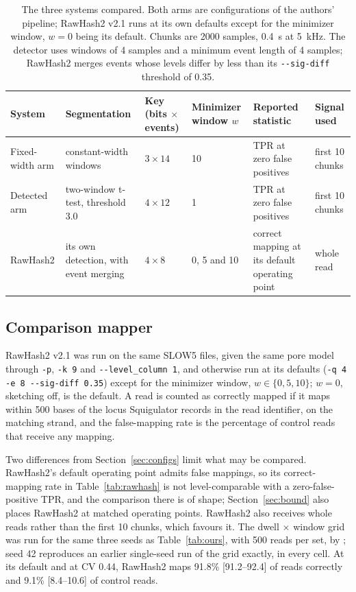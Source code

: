 \documentclass[11pt,a4paper]{article}
\begin{document}
\begin{table}[t]
\centering
\caption{The three systems compared. Both arms are configurations of the authors' pipeline;
RawHash2 v2.1 runs at its own defaults except for the minimizer window, $w = 0$ being its default.
Chunks are 2000 samples, 0.4~s at 5~kHz. The detector uses windows of 4 samples and a minimum event
length of 4 samples; RawHash2 merges events whose levels differ by less than its
\texttt{-{}-sig-diff} threshold of 0.35.}
\label{tab:configs}
\small
\setlength{\tabcolsep}{4pt}
\begin{tabular}{L{2.1cm}L{3.3cm}L{1.6cm}L{1.6cm}L{3.0cm}L{1.8cm}}
\toprule
System & Segmentation & Key (bits $\times$ events) & Minimizer window $w$ & Reported statistic & Signal used \\
\midrule
Fixed-width arm & constant-width windows & $3 \times 14$ & 10 & TPR at zero false positives & first 10 chunks \\
Detected arm & two-window t-test, threshold 3.0 & $4 \times 12$ & 1 & TPR at zero false positives & first 10 chunks \\
RawHash2 & its own detection, with event merging & $4 \times 8$ & 0, 5 and 10 & correct mapping at its default operating point & whole read \\
\bottomrule
\end{tabular}
\end{table}

\subsection{Comparison mapper}\label{sec:rawhash}

RawHash2 v2.1 was run on the same SLOW5 files, given the same pore model through \texttt{-p},
\texttt{-k~9} and \texttt{-{}-level\_column~1}, and otherwise run at its defaults
(\texttt{-q 4 -e 8 -{}-sig-diff 0.35}) except for the minimizer window, $w \in \{0, 5, 10\}$;
$w = 0$, sketching off, is the default. A read is counted as correctly mapped if it maps within 500 bases
of the locus Squigulator records in the read identifier, on the matching strand, and the
false-mapping rate is the percentage of control reads that receive any mapping.

Two differences from Section~\ref{sec:configs} limit what may be compared. RawHash2's default
operating point admits false mappings, so its correct-mapping rate in Table~\ref{tab:rawhash} is not
level-comparable with a zero-false-positive TPR, and the comparison there is of shape;
Section~\ref{sec:bound} also places RawHash2 at matched operating points. RawHash2 also receives
whole reads rather than the first 10 chunks, which favours it. The dwell $\times$ window grid was run for the same
three seeds as Table~\ref{tab:ours}, with 500 reads per set, by
; seed 42 reproduces an earlier single-seed run of the grid
exactly, in every cell. At its default and at CV 0.44, RawHash2 maps 91.8\% [91.2--92.4] of reads
correctly and 9.1\% [8.4--10.6] of control reads.
\end{document}
